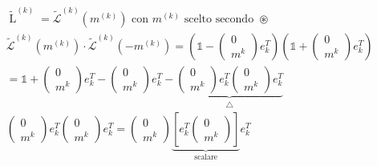 \documentclass{article}
\begin{document}
\begin{align*}
     & \widetilde{\operatorname{L}}^{(k)}=\widetilde{\mathcal{L}}^{(k)}\left(m^{(k)}\right) \text{ con }m^{(k)}\text{ scelto secondo } \circledast                                                              \\
     & \widetilde{\mathcal{L}}^{(k)}\left(m^{(k)}\right)\cdot\widetilde{\mathcal{L}}^{(k)}\left(-m^{(k)}\right)=\left(\mathbb 1-\begin{pmatrix}
                                                                                                                                        0 \\
                                                                                                                                        m^k
                                                                                                                                    \end{pmatrix}e^T_k\right)
    \left(\mathbb 1+\begin{pmatrix}
                            0 \\
                            m^k
                        \end{pmatrix}e^T_k\right)                                                                                                                                                                   \\
     & =\mathbb 1 + \begin{pmatrix}0\\m^k\end{pmatrix}e^T_k-\begin{pmatrix}0\\m^k\end{pmatrix}e^T_k-\underbrace{\begin{pmatrix}0\\m^k\end{pmatrix}e^T_k\begin{pmatrix}0\\m^k\end{pmatrix}e^T_k}_{\triangle}     \\
     & \begin{pmatrix}0\\m^k\end{pmatrix}e^T_k\begin{pmatrix}0\\m^k\end{pmatrix}e^T_k=\begin{pmatrix}0\\m^k\end{pmatrix}\underbrace{\left[e^T_k\begin{pmatrix}0\\m^k\end{pmatrix}\right]}_{\text{scalare}}e^T_k \\

\end{align*}
\end{document}
